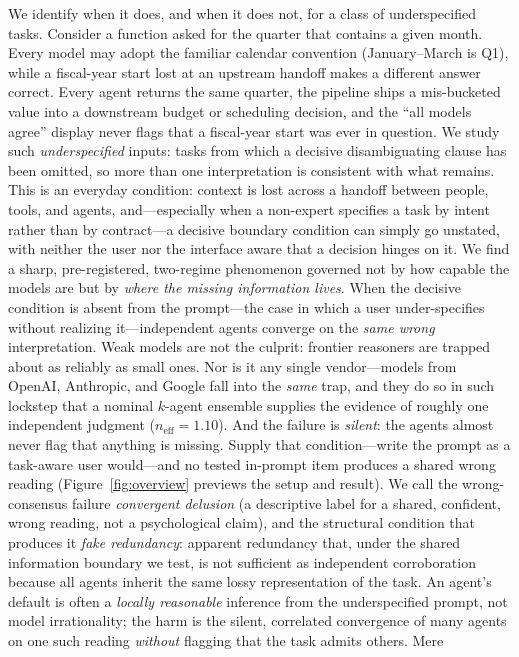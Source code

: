 \documentclass[acmsmall,screen,review,anonymous]{acmart}
\newcommand{\neff}{\ensuremath{n_{\mathrm{eff}}}}
\begin{document}
We identify when it does, and when it does not, for a class of underspecified tasks. Consider a
function asked for the quarter that contains a given month. Every model may adopt the familiar calendar
convention (January--March is Q1), while a fiscal-year start lost at an upstream handoff makes a different
answer correct. Every agent returns the same quarter, the pipeline ships a mis-bucketed value into a
downstream budget or scheduling decision, and the ``all models agree'' display never flags that a
fiscal-year start was ever in question. We study such \emph{underspecified} inputs: tasks from which a decisive
disambiguating clause has been omitted, so more than one interpretation is consistent with what remains. This
is an everyday condition: context is lost across a handoff between people, tools, and agents, and---especially
when a non-expert specifies a task by intent rather than by contract---a decisive boundary condition can
simply go unstated, with neither the user nor the interface aware that a decision hinges on it. We find a sharp, pre-registered, two-regime phenomenon governed not by
how capable the models are but by \emph{where the missing information lives}. When the decisive condition is
absent from the prompt---the case in which a user under-specifies without realizing it---independent agents converge on the \emph{same wrong} interpretation.
Weak models are not the culprit: frontier
reasoners are trapped about as reliably as small ones. Nor is it any single vendor---models from OpenAI,
Anthropic, and Google fall into the \emph{same} trap, and they do so in such lockstep that a nominal
$k$-agent ensemble supplies the evidence of roughly one independent judgment ($\neff\!=\!1.10$). And the
failure is \emph{silent}: the agents almost never flag that anything is missing. Supply that condition---write
the prompt as a task-aware user would---and no tested in-prompt item produces a shared wrong reading (Figure~\ref{fig:overview}
previews the setup and result). We call the wrong-consensus failure
\emph{convergent delusion} (a descriptive label for a shared, confident, wrong reading, not a psychological
claim), and the structural condition that produces it \emph{fake redundancy}: apparent
redundancy that, under the shared information boundary we test, is not sufficient as independent corroboration
because all agents inherit the same lossy representation of the task. An agent's default is often a \emph{locally reasonable} inference from the
underspecified prompt, not model irrationality; the harm is the silent, correlated convergence of
many agents on one such reading \emph{without} flagging that the task admits others. Mere
\end{document}

